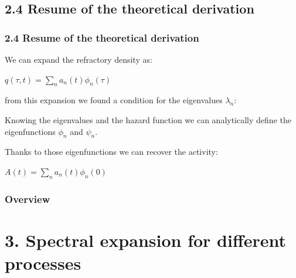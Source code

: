 \documentclass{beamer}
\begin{document}
\subsection{2.4 Resume of the theoretical derivation}
\begin{frame}
\frametitle{2.4 Resume of the theoretical derivation}

We can expand the refractory density as:

\vspace{0.2cm}
\hspace{3.1cm}
$q(\tau,t)=\sum_n a_n(t)\phi_n(\tau) $

\pause
\vspace{0.3cm}
from this expansion we found a condition for the eigenvalues $\lambda_n$:
\hspace{2.5cm}

\pause
\vspace{0.3cm}
Knowing the eigenvalues and the hazard function we can analytically define the eigenfunctions $\phi_n$ and $\psi_n$.

\pause
\vspace{0.3cm}
Thanks to those eigenfunctions we can recover the activity: %

\vspace{0.2cm}
\hspace{3.cm}$A(t)=\sum_n a_n(t)\phi_n(0) $%

\end{frame}


\begin{frame}
\frametitle{Overview}%
\tableofcontents %
\end{frame}

\section{3. Spectral expansion for different processes}
\end{document}

